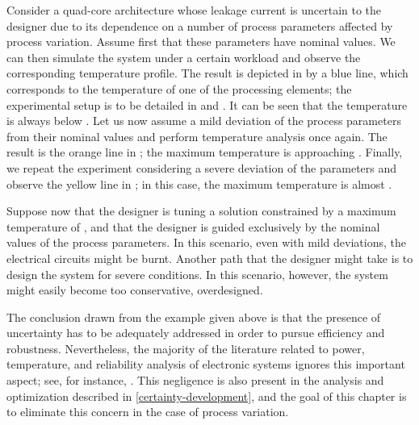 Consider a quad-core architecture whose leakage current is uncertain to the
designer due to its dependence on a number of process parameters affected by
process variation. Assume first that these parameters have nominal values. We
can then simulate the system under a certain workload and observe the
corresponding temperature profile. The result is depicted in
 by a blue line, which corresponds to the temperature of
one of the processing elements; the experimental setup is to be detailed in
 and . It can be
seen that the temperature is always below . Let us now assume a mild
deviation of the process parameters from their nominal values and perform
temperature analysis once again. The result is the orange line in
; the maximum temperature is approaching .
Finally, we repeat the experiment considering a severe deviation of the
parameters and observe the yellow line in ; in this case,
the maximum temperature is almost .

Suppose now that the designer is tuning a solution constrained by a maximum
temperature of , and that the designer is guided exclusively by the
nominal values of the process parameters. In this scenario, even with mild
deviations, the electrical circuits might be burnt. Another path that the
designer might take is to design the system for severe conditions. In this
scenario, however, the system might easily become too conservative,
overdesigned.

The conclusion drawn from the example given above is that the presence of
uncertainty has to be adequately addressed in order to pursue efficiency and
robustness. Nevertheless, the majority of the literature related to power,
temperature, and reliability analysis of electronic systems ignores this
important aspect; see, for instance, \cite{rao2009, rai2011, thiele2011}. This
negligence is also present in the analysis and optimization described in
\cref{certainty-development}, and the goal of this chapter is to eliminate this
concern in the case of process variation.

